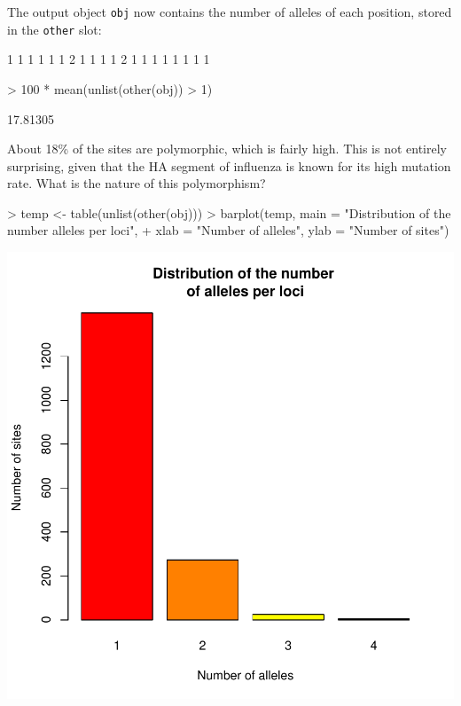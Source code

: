 \documentclass{article}
\begin{document}
\noindent The output object \texttt{obj} now contains the number of alleles of each position, stored
in the \texttt{other} slot:
\begin{Schunk}
\begin{Soutput}
 [1] 1 1 1 1 1 1 2 1 1 1 1 2 1 1 1 1 1 1 1 1
\end{Soutput}
\begin{Sinput}
> 100 * mean(unlist(other(obj)) > 1)
\end{Sinput}
\begin{Soutput}
[1] 17.81305
\end{Soutput}
\end{Schunk}
About 18\% of the sites are polymorphic, which is fairly high.
This is not entirely surprising, given that the HA segment of influenza is known for its high
mutation rate.
What is the nature of this polymorphism?
\begin{Schunk}
\begin{Sinput}
> temp <- table(unlist(other(obj)))
> barplot(temp, main = "Distribution of the number \nof alleles per loci", 
+     xlab = "Number of alleles", ylab = "Number of sites")
\end{Sinput}
\end{Schunk}
\includegraphics{figs/genomics-030}
\end{document}
